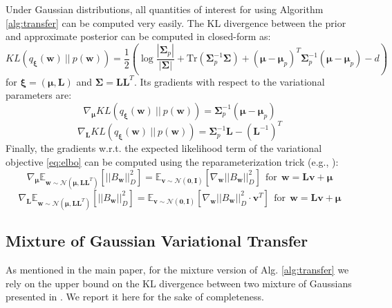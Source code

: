 \documentclass{article}
\begin{document}
Under Gaussian distributions, all quantities of interest for using Algorithm \ref{alg:transfer} can be computed very easily. The KL divergence between the prior and approximate posterior can be computed in closed-form as:
\begin{equation}
KL\left(q_{\bm{\xi}}(\bm{w})\ ||\ p(\bm{w})\right) = \frac{1}{2}\left( \log\frac{\left\lvert \bm{\Sigma}_p \right\rvert}{\left\lvert \bm{\Sigma} \right\rvert} + \text{Tr}\left( \bm{\Sigma}_p^{-1}\bm{\Sigma} \right) + (\bm{\mu} - \bm{\mu}_p)^T \bm{\Sigma}_p^{-1} (\bm{\mu} - \bm{\mu}_p) -d \right)
\end{equation}
for $\bm{\xi} = (\bm{\mu},\bm{L})$ and $\bm{\Sigma} = \bm{LL}^T$. Its gradients with respect to the variational parameters are:
\begin{equation}\label{eq:klgradmu}
\nabla_{\bm{\mu}} KL\left(q_{\bm{\xi}}(\bm{w})\ ||\ p(\bm{w})\right) = \bm{\Sigma}_p^{-1} (\bm{\mu} - \bm{\mu}_p)
\end{equation}
\begin{equation}\label{eq:klgradL}
\nabla_{\bm{L}} KL\left(q_{\bm{\xi}}(\bm{w})\ ||\ p(\bm{w})\right) = \bm{\Sigma}_p^{-1}\bm{L} - (\bm{L}^{-1})^T 
\end{equation}
Finally, the gradients w.r.t. the expected likelihood term of the variational objective \eqref{eq:elbo} can be computed using the reparameterization trick (e.g., \cite{hoffman2013stochastic,rezende2014stochastic}):
\begin{equation}\label{eq:tdgradmu}
\nabla_{\bm{\mu}} \mathbb{E}_{\bm{w} \sim \mathcal{N}(\bm{\mu},\bm{LL}^T)}\left[ ||B_{\bm{w}}||_{D}^2 \right] = \mathbb{E}_{\bm{v} \sim \mathcal{N}(\bm{0},\bm{I})}\left[ \nabla_{\bm{w}} ||B_{\bm{w}}||_{D}^2 \right]\ \ \text{for}\ \ \bm{w} = \bm{Lv} + \bm{\mu}
\end{equation} 
\begin{equation}\label{eq:tdgradL}
\nabla_{\bm{L}} \mathbb{E}_{\bm{w} \sim \mathcal{N}(\bm{\mu},\bm{LL}^T)}\left[ ||B_{\bm{w}}||_{D}^2 \right] = \mathbb{E}_{\bm{v} \sim \mathcal{N}(\bm{0},\bm{I})}\left[ \nabla_{\bm{w}} ||B_{\bm{w}}||_{D}^2 \cdot \bm{v}^T \right]\ \ \text{for}\ \ \bm{w} = \bm{Lv} + \bm{\mu}
\end{equation}

\subsection{Mixture of Gaussian Variational Transfer}\label{app:b3}

As mentioned in the main paper, for the mixture version of Alg. \ref{alg:transfer} we rely on the upper bound on the KL divergence between two mixture of Gaussians presented in \cite{hershey2007approximating}. We report it here for the sake of completeness.
\end{document}
